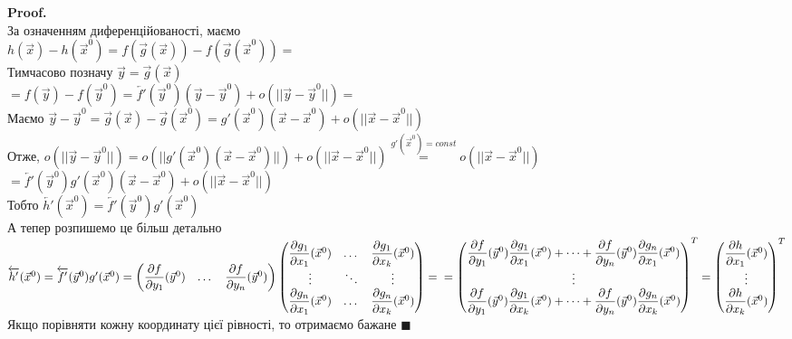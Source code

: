 \documentclass[a4paper, 14pt]{extarticle}
\def\bigline{\vspace{5mm}\\}
\theoremstyle{theoremdd}
\theoremstyle{theoremdd}
\theoremstyle{theoremdd}
\theoremstyle{theoremdd}
\theoremstyle{theoremdd}
\theoremstyle{theoremdd}
\theoremstyle{theoremdd}
\theoremstyle{theoremdd}
\newenvironment{pf}{\vspace*{-3mm} \textbf{Proof. \\}}{$\blacksquare$}
\def\departial#1#2{\dfrac{\partial {#1}}{\partial {#2}}}
\begin{document}
\begin{pf}
За означенням диференційованості, маємо\\
$h(\vec{x}) - h(\vec{x}^0) = f(\vec{g}(\vec{x})) - f(\vec{g}(\vec{x}^0)) =$\\
Тимчасово позначу $\vec{y} = \vec{g}(\vec{x})$\\
$=f(\vec{y}) - f(\vec{y}^0) = \overleftarrow{f'}(\vec{y}^0) (\vec{y} - \vec{y}^0) + o(||\vec{y} - \vec{y}^0||) \boxed{=}$\\
Маємо $\vec{y} - \vec{y}^0 = \vec{g}(\vec{x}) - \vec{g}(\vec{x}^0) = g'(\vec{x}^0)(\vec{x}-\vec{x}^0) + o(||\vec{x}-\vec{x}^0||)$\\
Отже, $o(||\vec{y}-\vec{y}^0||) = o(||g'(\vec{x}^0)(\vec{x}-\vec{x}^0)||) + o(||\vec{x}-\vec{x}^0||) \overset{g'(\vec{x}^0) = const}{=} o(||\vec{x}-\vec{x}^0||)$\\
$\boxed{=} \overleftarrow{f'}(\vec{y}^0)g'(\vec{x}^0)(\vec{x}-\vec{x}^0) + o(||\vec{x} - \vec{x}^0||)$\\
Тобто $\overleftarrow{h'}(\vec{x}^0) = \overleftarrow{f'}(\vec{y}^0) g'(\vec{x}^0)$
\bigline
А тепер розпишемо це більш детально\\
$\overleftarrow{h'}(\vec{x}^0) = \overleftarrow{f'}(\vec{y}^0) g'(\vec{x}^0) = \begin{pmatrix}
\departial{f}{y_1}(\vec{y}^0) & \dots & \departial{f}{y_n}(\vec{y}^0)
\end{pmatrix} \begin{pmatrix}
 \departial{g_1}{x_1}(\vec{x}^0) & \dots & \departial{g_1}{x_k}(\vec{x}^0) \\
 \vdots & \ddots & \vdots \\
 \departial{g_n}{x_1}(\vec{x}^0) & \dots & \departial{g_n}{x_k}(\vec{x}^0)
\end{pmatrix} = \\
= \begin{pmatrix}
\departial{f}{y_1}(\vec{y}^0)\departial{g_1}{x_1}(\vec{x}^0) + \dots + \departial{f}{y_n}(\vec{y}^0)\departial{g_n}{x_1}(\vec{x}^0)\\
\vdots \\
\departial{f}{y_1}(\vec{y}^0)\departial{g_1}{x_k}(\vec{x}^0) + \dots + \departial{f}{y_n}(\vec{y}^0)\departial{g_n}{x_k}(\vec{x}^0)\\
\end{pmatrix}^T = \begin{pmatrix}
\departial{h}{x_1}(\vec{x}^0) \\ \vdots \\ \departial{h}{x_k}(\vec{x}^0)
\end{pmatrix}^T$\\
Якщо порівняти кожну координату цієї рівності, то отримаємо бажане
\end{pf}
\end{document}
